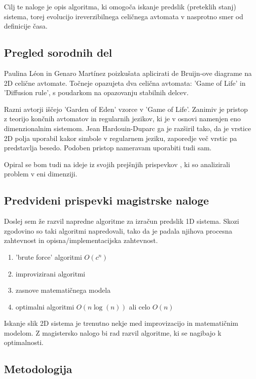 \documentclass[a4paper, 12pt]{article}
\begin{document}
Cilj te naloge je opis algoritma, ki omogoča iskanje predslik (preteklih stanj) sistema, torej evolucijo
ireverzibilnega celičnega avtomata v nasprotno smer od definicije časa.

\subsection{Pregled sorodnih del}

Paulina Léon in Genaro Martínez \cite{PaulinaGenaro2016} poizkušata aplicirati
de Bruijn-ove diagrame na 2D celične avtomate. Točneje opazujeta dva celična avtomata:
'Game of Life' in 'Diffusion rule', s poudarkom na opazovanju stabilnih delcev.

Razni avtorji \cite{Hartman2013} iščejo 'Garden of Eden' vzorce v 'Game of Life'.
Zanimiv je pristop z teorijo končnih avtomatov in regularnih jezikov, ki je v
osnovi namenjen eno dimenzionalnim sistemom. Jean Hardouin-Duparc \cite{} ga je razširil
tako, da je vrstice 2D polja uporabil kakor simbole v regularnem jeziku, zaporedje več
vrstic pa predstavlja besedo. Podoben pristop nameravam uporabiti tudi sam.

Opiral se bom tudi na ideje iz svojih prejšnjih prispevkov \cite{Jeras2007}
\cite{DBLP:conf/iccS/JerasD06} \cite{DBLP:conf/automata/Jeras08},
ki so analizirali problem v eni dimenziji.

\subsection{Predvideni prispevki magistrske naloge}

Doslej sem že razvil napredne algoritme za izračun predslik 1D sistema.
Skozi zgodovino so taki algoritmi napredovali, tako da je padala njihova
procesna zahtevnost in opisna/implementacijska zahtevnost.
\begin{enumerate}
\item 'brute force' algoritmi \( O(c^n) \)
\item improvizirani algoritmi
\item zasnove matematičnega modela
\item optimalni algoritmi \( O(n \log(n)) \) ali celo \( O(n) \)
\end{enumerate}
Iskanje slik 2D sistema je trenutno nekje med improvizacijo in matematičnim modelom.
Z magistersko nalogo bi rad razvil algoritme, ki se nagibajo k optimalnosti.

\subsection{Metodologija}
\end{document}

